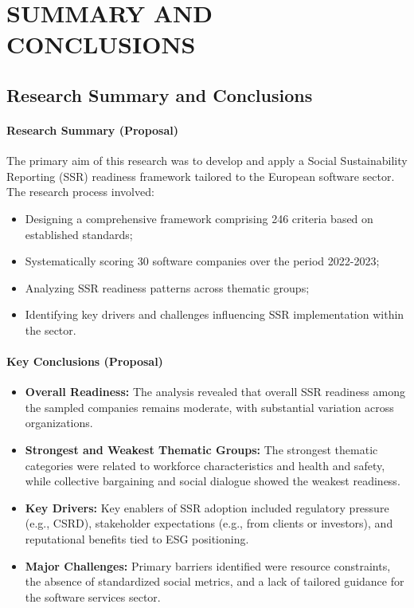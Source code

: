 \chapter{SUMMARY AND CONCLUSIONS}

\section{Research Summary and Conclusions}

\subsubsection{Research Summary (Proposal)}

The primary aim of this research was to develop and apply a Social Sustainability Reporting (SSR) 
readiness framework tailored to the European software sector. The research process involved:

\begin{itemize}
    \item Designing a comprehensive framework comprising 246 criteria based on established standards;
    \item Systematically scoring 30 software companies over the period 2022-2023;
    \item Analyzing SSR readiness patterns across thematic groups;
    \item Identifying key drivers and challenges influencing SSR implementation within the sector.
\end{itemize}

\subsubsection{Key Conclusions (Proposal)}

\begin{itemize}
    \item \textbf{Overall Readiness:} The analysis revealed that overall SSR readiness 
    among the sampled companies remains moderate, with substantial variation across organizations.

    \item \textbf{Strongest and Weakest Thematic Groups:} The strongest thematic categories were related to 
    workforce characteristics and health and safety, while collective bargaining 
    and social dialogue showed the weakest readiness.
    \item \textbf{Key Drivers:} Key enablers of SSR adoption included regulatory pressure (e.g., CSRD), 
    stakeholder expectations (e.g., from clients or investors), and reputational benefits tied to ESG positioning.
    
    \item \textbf{Major Challenges:} Primary barriers identified were resource constraints, 
    the absence of standardized social metrics, and a lack of tailored guidance for the software services sector.
\end{itemize}

